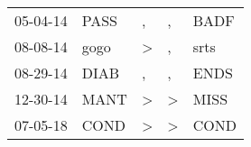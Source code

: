 \begin{supertabular}{lllll}
 05-04-14 &  PASS &             , &             , &  BADF \\
 08-08-14 &  gogo &  \textgreater &             , &  srts \\
 08-29-14 &  DIAB &             , &             , &  ENDS \\
 12-30-14 &  MANT &  \textgreater &  \textgreater &  MISS \\
 07-05-18 &  COND &  \textgreater &  \textgreater &  COND \\
\end{supertabular}
